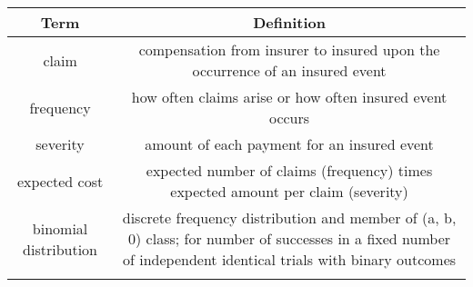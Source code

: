 \documentclass[]{book}
\theoremstyle{definition}
\theoremstyle{definition}
\theoremstyle{definition}
\theoremstyle{remark}
\begin{document}
\begin{longtable}[]{@{}cc@{}}
\toprule
\begin{minipage}[b]{0.43\columnwidth}\centering\strut
Term\strut
\end{minipage} & \begin{minipage}[b]{0.43\columnwidth}\centering\strut
Definition\strut
\end{minipage}\tabularnewline
\midrule
\endhead
\begin{minipage}[t]{0.43\columnwidth}\centering\strut
claim\strut
\end{minipage} & \begin{minipage}[t]{0.43\columnwidth}\centering\strut
compensation from insurer to insured upon the occurrence of an insured
event\strut
\end{minipage}\tabularnewline
\begin{minipage}[t]{0.43\columnwidth}\centering\strut
frequency\strut
\end{minipage} & \begin{minipage}[t]{0.43\columnwidth}\centering\strut
how often claims arise or how often insured event occurs\strut
\end{minipage}\tabularnewline
\begin{minipage}[t]{0.43\columnwidth}\centering\strut
severity\strut
\end{minipage} & \begin{minipage}[t]{0.43\columnwidth}\centering\strut
amount of each payment for an insured event\strut
\end{minipage}\tabularnewline
\begin{minipage}[t]{0.43\columnwidth}\centering\strut
expected cost\strut
\end{minipage} & \begin{minipage}[t]{0.43\columnwidth}\centering\strut
expected number of claims (frequency) times expected amount per claim
(severity)\strut
\end{minipage}\tabularnewline
\begin{minipage}[t]{0.43\columnwidth}\centering\strut
binomial distribution\strut
\end{minipage} & \begin{minipage}[t]{0.43\columnwidth}\centering\strut
discrete frequency distribution and member of (a, b, 0) class; for
number of successes in a fixed number of independent identical trials
with binary outcomes\strut
\end{minipage}\tabularnewline
\begin{minipage}[t]{0.43\columnwidth}\centering\strut

\end{minipage}
\end{longtable}
\end{document}
